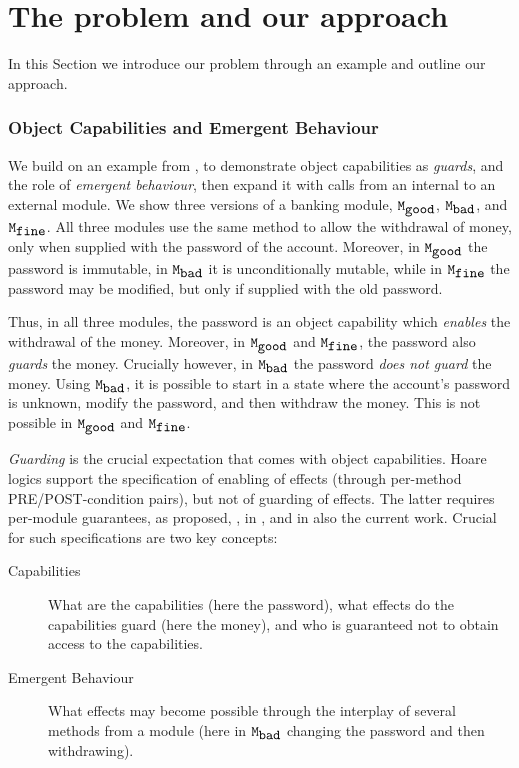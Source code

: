 
\section{The problem and our approach}
\label{s:outline}
  
In this Section we introduce our problem  through an example and outline our approach.

   \subsubsection{Object Capabilities and Emergent Behaviour} %
\label{s:bank}
We {build}  on an example from \cite{XXXELang,FASE},  
to demonstrate  object capabilities as \emph{guards}, and the role of
  \emph{emergent behaviour}, 
 then expand it %
{with} calls from an internal to an external module.
%
We show three versions of a banking module, $\mbox{\normalfont{\texttt{M}}}_{\mbox{\normalfont{\texttt{good}}}}$, $\mbox{\normalfont{\texttt{M}}}_{\mbox{\normalfont{\texttt{bad}}}}$, and $\mbox{\normalfont{\texttt{M}}}_{\mbox{\normalfont{\texttt{fine}}}}$. 
All three modules  {use the same method to} allow the withdrawal of money, only when supplied with the password of the account.
Moreover, in $\mbox{\normalfont{\texttt{M}}}_{\mbox{\normalfont{\texttt{good}}}}$ the password is immutable, in $\mbox{\normalfont{\texttt{M}}}_{\mbox{\normalfont{\texttt{bad}}}}$ it is unconditionally mutable, while in $\mbox{\normalfont{\texttt{M}}}_{\mbox{\normalfont{\texttt{fine}}}}$ the password may be modified, but only if supplied with the old password. 


{Thus, in all three modules, the password is an object capability which \emph{enables} the withdrawal of the money. 
Moreover, in $\mbox{\normalfont{\texttt{M}}}_{\mbox{\normalfont{\texttt{good}}}}$ and $\mbox{\normalfont{\texttt{M}}}_{\mbox{\normalfont{\texttt{fine}}}}$, the password also \emph{guards} the money.
Crucially however,  in $\mbox{\normalfont{\texttt{M}}}_{\mbox{\normalfont{\texttt{bad}}}}$ the password \emph{does not guard} the money. 
Using $\mbox{\normalfont{\texttt{M}}}_{\mbox{\normalfont{\texttt{bad}}}}$, it is possible to start in a state where the account's password is unknown, modify the password, and then withdraw the money. 
 This is not possible  in $\mbox{\normalfont{\texttt{M}}}_{\mbox{\normalfont{\texttt{good}}}}$ and $\mbox{\normalfont{\texttt{M}}}_{\mbox{\normalfont{\texttt{fine}}}}$.
}

\emph{Guarding} is the crucial expectation that comes with object capabilities.
Hoare logics support the specification of    enabling of effects (through per-method PRE/POST-condition pairs), but not of guarding of effects.
The latter %
requires per-module guarantees, as proposed, \eg,  in \cite{OOPSLA22}, and in also the current work.
%
\noindent
Crucial for such specifications are  two key concepts:
\begin{description}
\item[Capabilities] What are the capabilities (here the password), what effects do the capabilities {guard} (here the money), 
and who is guaranteed not to obtain access to the capabilities.
\item[Emergent Behaviour] What effects may become possible through the interplay of several methods from a module  (here in ${\mbox{\normalfont{\texttt{M}}}_{\mbox{\normalfont{\texttt{bad}}}}}$  
{changing the password and then withdrawing}).
\end{description} 

